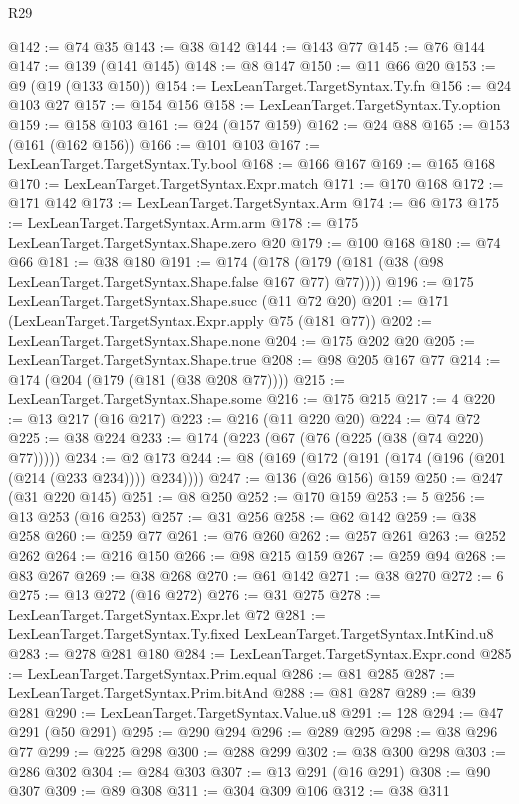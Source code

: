 \begin{lexlean}{R29}
\begin{coremodule}
@142 := @74 @35
@143 := @38 @142
@144 := @143 @77
@145 := @76 @144
@147 := @139 (@141 @145)
@148 := @8 @147
@150 := @11 @66 @20
@153 := @9 (@19 (@133 @150))
@154 := LexLeanTarget.TargetSyntax.Ty.fn
@156 := @24 @103 @27
@157 := @154 @156
@158 := LexLeanTarget.TargetSyntax.Ty.option
@159 := @158 @103
@161 := @24 (@157 @159)
@162 := @24 @88
@165 := @153 (@161 (@162 @156))
@166 := @101 @103
@167 := LexLeanTarget.TargetSyntax.Ty.bool
@168 := @166 @167
@169 := @165 @168
@170 := LexLeanTarget.TargetSyntax.Expr.match
@171 := @170 @168
@172 := @171 @142
@173 := LexLeanTarget.TargetSyntax.Arm
@174 := @6 @173
@175 := LexLeanTarget.TargetSyntax.Arm.arm
@178 := @175 LexLeanTarget.TargetSyntax.Shape.zero @20
@179 := @100 @168
@180 := @74 @66
@181 := @38 @180
@191 := @174 (@178 (@179 (@181 (@38 (@98 LexLeanTarget.TargetSyntax.Shape.false @167 @77) @77))))
@196 := @175 LexLeanTarget.TargetSyntax.Shape.succ (@11 @72 @20)
@201 := @171 (LexLeanTarget.TargetSyntax.Expr.apply @75 (@181 @77))
@202 := LexLeanTarget.TargetSyntax.Shape.none
@204 := @175 @202 @20
@205 := LexLeanTarget.TargetSyntax.Shape.true
@208 := @98 @205 @167 @77
@214 := @174 (@204 (@179 (@181 (@38 @208 @77))))
@215 := LexLeanTarget.TargetSyntax.Shape.some
@216 := @175 @215
@217 := 4
@220 := @13 @217 (@16 @217)
@223 := @216 (@11 @220 @20)
@224 := @74 @72
@225 := @38 @224
@233 := @174 (@223 (@67 (@76 (@225 (@38 (@74 @220) @77)))))
@234 := @2 @173
@244 := @8 (@169 (@172 (@191 (@174 (@196 (@201 (@214 (@233 @234)))) @234))))
@247 := @136 (@26 @156) @159
@250 := @247 (@31 @220 @145)
@251 := @8 @250
@252 := @170 @159
@253 := 5
@256 := @13 @253 (@16 @253)
@257 := @31 @256
@258 := @62 @142
@259 := @38 @258
@260 := @259 @77
@261 := @76 @260
@262 := @257 @261
@263 := @252 @262
@264 := @216 @150
@266 := @98 @215 @159
@267 := @259 @94
@268 := @83 @267
@269 := @38 @268
@270 := @61 @142
@271 := @38 @270
@272 := 6
@275 := @13 @272 (@16 @272)
@276 := @31 @275
@278 := LexLeanTarget.TargetSyntax.Expr.let @72
@281 := LexLeanTarget.TargetSyntax.Ty.fixed LexLeanTarget.TargetSyntax.IntKind.u8
@283 := @278 @281 @180
@284 := LexLeanTarget.TargetSyntax.Expr.cond
@285 := LexLeanTarget.TargetSyntax.Prim.equal
@286 := @81 @285
@287 := LexLeanTarget.TargetSyntax.Prim.bitAnd
@288 := @81 @287
@289 := @39 @281
@290 := LexLeanTarget.TargetSyntax.Value.u8
@291 := 128
@294 := @47 @291 (@50 @291)
@295 := @290 @294
@296 := @289 @295
@298 := @38 @296 @77
@299 := @225 @298
@300 := @288 @299
@302 := @38 @300 @298
@303 := @286 @302
@304 := @284 @303
@307 := @13 @291 (@16 @291)
@308 := @90 @307
@309 := @89 @308
@311 := @304 @309 @106
@312 := @38 @311

\end{coremodule}
\end{lexlean}
